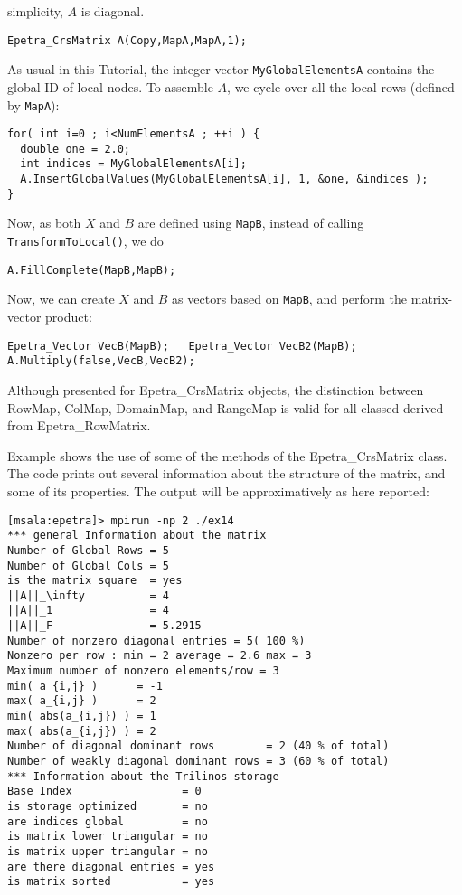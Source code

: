 simplicity, $A$ is diagonal.
\begin{verbatim}
Epetra_CrsMatrix A(Copy,MapA,MapA,1);
\end{verbatim}
As usual in this Tutorial, the integer vector \verb!MyGlobalElementsA!
contains the global ID of local nodes. To assemble $A$, we cycle over
all the local rows (defined by \verb!MapA!):
\begin{verbatim}
for( int i=0 ; i<NumElementsA ; ++i ) {
  double one = 2.0;
  int indices = MyGlobalElementsA[i];
  A.InsertGlobalValues(MyGlobalElementsA[i], 1, &one, &indices );
}
\end{verbatim}
Now, as both $X$ and $B$ are defined using \verb!MapB!, instead of
calling \verb!TransformToLocal()!, we do
\begin{verbatim}
A.FillComplete(MapB,MapB);
\end{verbatim}
Now, we can create $X$ and $B$ as vectors based on \verb!MapB!, and
perform the matrix-vector product:
\begin{verbatim}
Epetra_Vector VecB(MapB);   Epetra_Vector VecB2(MapB);  
A.Multiply(false,VecB,VecB2);
\end{verbatim}  

\begin{remark}
Although presented for Epetra\_CrsMatrix objects, the distinction
between RowMap, ColMap, DomainMap, and RangeMap is valid for all classed
derived from Epetra\_RowMatrix. 
\end{remark}


\medskip

Example  shows the use of some of the methods of 
the Epetra\_CrsMatrix class. The code prints out several information
about the structure of the matrix, and some of its properties.
The output will be approximatively as here reported:
\begin{verbatim}
[msala:epetra]> mpirun -np 2 ./ex14
*** general Information about the matrix
Number of Global Rows = 5
Number of Global Cols = 5
is the matrix square  = yes
||A||_\infty          = 4
||A||_1               = 4
||A||_F               = 5.2915
Number of nonzero diagonal entries = 5( 100 %)
Nonzero per row : min = 2 average = 2.6 max = 3
Maximum number of nonzero elements/row = 3
min( a_{i,j} )      = -1
max( a_{i,j} )      = 2
min( abs(a_{i,j}) ) = 1
max( abs(a_{i,j}) ) = 2
Number of diagonal dominant rows        = 2 (40 % of total)
Number of weakly diagonal dominant rows = 3 (60 % of total)
*** Information about the Trilinos storage
Base Index                 = 0
is storage optimized       = no
are indices global         = no
is matrix lower triangular = no
is matrix upper triangular = no
are there diagonal entries = yes
is matrix sorted           = yes
\end{verbatim}

